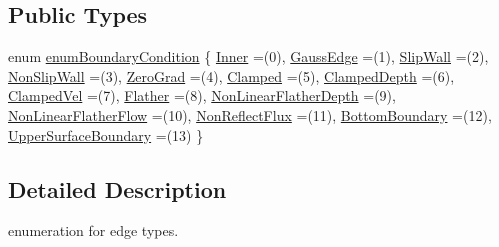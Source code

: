 \subsection*{Public Types}
\begin{DoxyCompactItemize}
\item 
enum \hyperlink{classenum_boundary_condition_a5c2eea43befdf6aff164a1177b1cceb0}{enum\+Boundary\+Condition} \{ \newline
\hyperlink{classenum_boundary_condition_a5c2eea43befdf6aff164a1177b1cceb0a370b9ea5dcfc1e584bdda9110ad266d3}{Inner} =(0), 
\hyperlink{classenum_boundary_condition_a5c2eea43befdf6aff164a1177b1cceb0a6f7cb3ca1a7ee428838560f6fc6b4e6b}{Gauss\+Edge} =(1), 
\hyperlink{classenum_boundary_condition_a5c2eea43befdf6aff164a1177b1cceb0a2b0eb18b188f08e05bd4948557f0b622}{Slip\+Wall} =(2), 
\hyperlink{classenum_boundary_condition_a5c2eea43befdf6aff164a1177b1cceb0ac2f16afd779868bcf2be8e5d3a76127d}{Non\+Slip\+Wall} =(3), 
\newline
\hyperlink{classenum_boundary_condition_a5c2eea43befdf6aff164a1177b1cceb0a257ba97049b6de602bc1958b3a185fdc}{Zero\+Grad} =(4), 
\hyperlink{classenum_boundary_condition_a5c2eea43befdf6aff164a1177b1cceb0a17aa9495010a26cac3b36ff041d988aa}{Clamped} =(5), 
\hyperlink{classenum_boundary_condition_a5c2eea43befdf6aff164a1177b1cceb0a1d2e0646eec963ee3710bddd8370dd83}{Clamped\+Depth} =(6), 
\hyperlink{classenum_boundary_condition_a5c2eea43befdf6aff164a1177b1cceb0a3f2dd6c5b8db4ac3e09f061588a1fa84}{Clamped\+Vel} =(7), 
\newline
\hyperlink{classenum_boundary_condition_a5c2eea43befdf6aff164a1177b1cceb0a8d896d2dee8ee64f6f90b101b7048a21}{Flather} =(8), 
\hyperlink{classenum_boundary_condition_a5c2eea43befdf6aff164a1177b1cceb0a835c1f25a6a3f4e26fd2b4e9cc05fbda}{Non\+Linear\+Flather\+Depth} =(9), 
\hyperlink{classenum_boundary_condition_a5c2eea43befdf6aff164a1177b1cceb0a91f33739df9a5f494e121b99dbbdc8f0}{Non\+Linear\+Flather\+Flow} =(10), 
\hyperlink{classenum_boundary_condition_a5c2eea43befdf6aff164a1177b1cceb0ad626acfe0e79a1270671014d86c1e8d6}{Non\+Reflect\+Flux} =(11), 
\newline
\hyperlink{classenum_boundary_condition_a5c2eea43befdf6aff164a1177b1cceb0ad4f8730813fe054e467c72db38862f74}{Bottom\+Boundary} =(12), 
\hyperlink{classenum_boundary_condition_a5c2eea43befdf6aff164a1177b1cceb0a5302f1f4a1e218e5bac7e2ce135b61ba}{Upper\+Surface\+Boundary} =(13)
 \}
\end{DoxyCompactItemize}


\subsection{Detailed Description}
enumeration for edge types. 

